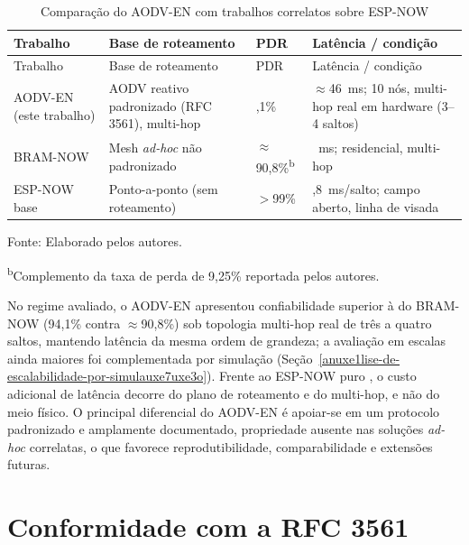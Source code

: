 {\def\LTcaptype{table}
\begin{longtable}[]{@{}
  >{\raggedright\arraybackslash}p{}
  >{\raggedright\arraybackslash}p{}
  >{\centering\arraybackslash}p{}
  >{\raggedright\arraybackslash}p{}@{}}
\caption{Comparação do AODV-EN com trabalhos correlatos sobre ESP-NOW}\label{tab:literatura}\\
\toprule\noalign{}
Trabalho & Base de roteamento & PDR & Latência / condição \\
\midrule\noalign{}
\endfirsthead
\toprule\noalign{}
Trabalho & Base de roteamento & PDR & Latência / condição \\
\midrule\noalign{}
\endhead
\bottomrule\noalign{}
\endlastfoot
AODV-EN (este trabalho) & AODV reativo padronizado (RFC 3561), multi-hop & 94,1\% & $\approx$46~ms; 10 nós, multi-hop real em hardware (3--4 saltos) \\
BRAM-NOW \cite{cujilema2023} & Mesh \emph{ad-hoc} não padronizado & $\approx$90,8\%\textsuperscript{b} & 75~ms; residencial, multi-hop \\
ESP-NOW base \cite{becker2025} & Ponto-a-ponto (sem roteamento) & $>$99\% & 2,8~ms/salto; campo aberto, linha de visada \\
\end{longtable}
}

Fonte: Elaborado pelos autores.

\noindent\footnotesize\textsuperscript{b}Complemento da taxa de perda de 9,25\% reportada pelos autores.
\normalsize

No regime avaliado, o AODV-EN apresentou confiabilidade superior à do BRAM-NOW
(94,1\% contra $\approx$90,8\%) sob topologia multi-hop real de três a quatro
saltos, mantendo latência da mesma ordem de grandeza; a avaliação em escalas
ainda maiores foi complementada por simulação
(Seção~\ref{anuxe1lise-de-escalabilidade-por-simulauxe7uxe3o}). Frente ao ESP-NOW
puro \cite{becker2025}, o custo adicional de latência decorre do plano de
roteamento e do multi-hop, e não do meio físico. O principal
diferencial do AODV-EN é apoiar-se em um protocolo padronizado e amplamente
documentado, propriedade ausente nas soluções \emph{ad-hoc} correlatas, o que
favorece reprodutibilidade, comparabilidade e extensões futuras.

\section{Conformidade com a RFC 3561}\label{conformidade-com-a-rfc-3561}

